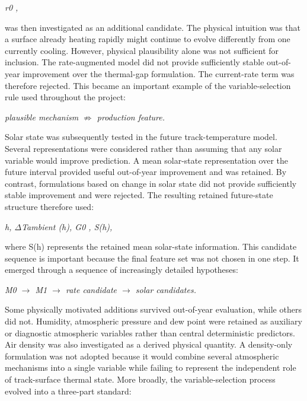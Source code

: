 \begin{center}\textit{r0 ,}\end{center}

was then investigated as an additional candidate. The physical intuition was that a surface already heating rapidly might continue to evolve differently from one currently cooling. However, physical plausibility alone was not sufficient for inclusion. The rate-augmented model did not provide sufficiently stable out-of-year improvement over the thermal-gap formulation. The current-rate term was therefore rejected. This became an important example of the variable-selection rule used throughout the project:

\begin{center}\textit{plausible mechanism \ensuremath{\nRightarrow} production feature.}\end{center}

Solar state was subsequently tested in the future track-temperature model. Several representations were considered rather than assuming that any solar variable would improve prediction. A mean solar-state representation over the future interval provided useful out-of-year improvement and was retained. By contrast, formulations based on change in solar state did not provide sufficiently stable improvement and were rejected. The resulting retained future-state structure therefore used:

\begin{center}\textit{h,      \ensuremath{\Delta}Tambient (h),     G0 ,       S(h),}\end{center}

where S(h) represents the retained mean solar-state information. This candidate sequence is important because the final feature set was not chosen in one step. It emerged through a sequence of increasingly detailed hypotheses:

\begin{center}\textit{M0 \ensuremath{\rightarrow} M1 \ensuremath{\rightarrow} rate candidate \ensuremath{\rightarrow} solar candidates.}\end{center}

Some physically motivated additions survived out-of-year evaluation, while others did not. Humidity, atmospheric pressure and dew point were retained as auxiliary or diagnostic atmospheric variables rather than central deterministic predictors. Air density was also investigated as a derived physical quantity. A density-only formulation was not adopted because it would combine several atmospheric mechanisms into a single variable while failing to represent the independent role of track-surface thermal state. More broadly, the variable-selection process evolved into a three-part standard:

